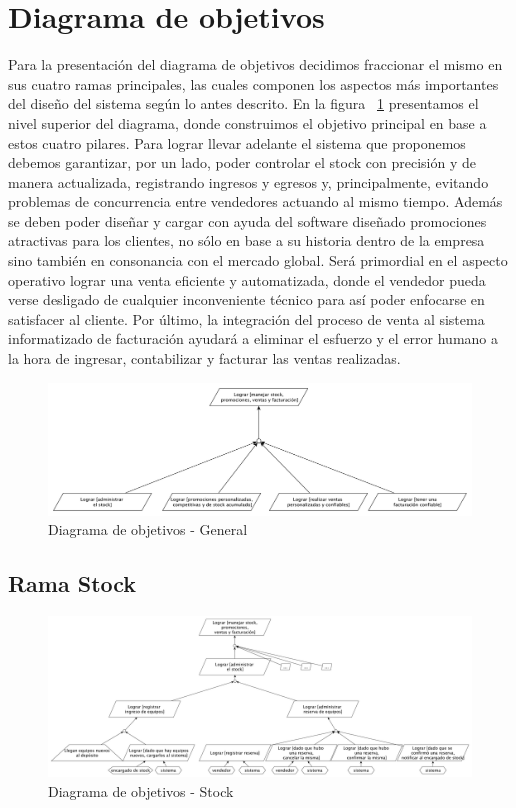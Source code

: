\clearpage


\section{Diagrama de objetivos}

Para la presentación del diagrama de objetivos decidimos fraccionar el mismo en sus cuatro ramas principales, las cuales componen los aspectos más importantes del diseño del sistema según lo antes descrito. En la figura ~\ref{fig:diagGen} presentamos el nivel superior del diagrama, donde construimos el objetivo principal en base a estos cuatro pilares. Para lograr llevar adelante el sistema que proponemos debemos garantizar, por un lado, poder controlar el stock con precisión y de manera actualizada, registrando ingresos y egresos y, principalmente, evitando problemas de concurrencia entre vendedores actuando al mismo tiempo. Además se deben poder diseñar y cargar con ayuda del software diseñado promociones atractivas para los clientes, no sólo en base a su historia dentro de la empresa sino también en consonancia con el mercado global. Será primordial en el aspecto operativo lograr una venta eficiente y automatizada, donde el vendedor pueda verse desligado de cualquier inconveniente técnico para así poder enfocarse en satisfacer al cliente. Por último, la integración del proceso de venta al sistema informatizado de facturación ayudará a eliminar el esfuerzo y el error humano a la hora de ingresar, contabilizar y facturar las ventas realizadas.

\begin{figure}[h!]
  \centering
  \includegraphics[width=1\textwidth]{./imagenes/general_top.pdf}
  \caption{Diagrama de objetivos - General}
  \label{fig:diagGen}
\end{figure}


\subsection{Rama Stock}

\begin{figure}[h!]
  \centering
  \includegraphics[width=1\textwidth]{./imagenes/stock.pdf}
  \caption{Diagrama de objetivos - Stock}
  \label{fig:diagStock}
\end{figure}

